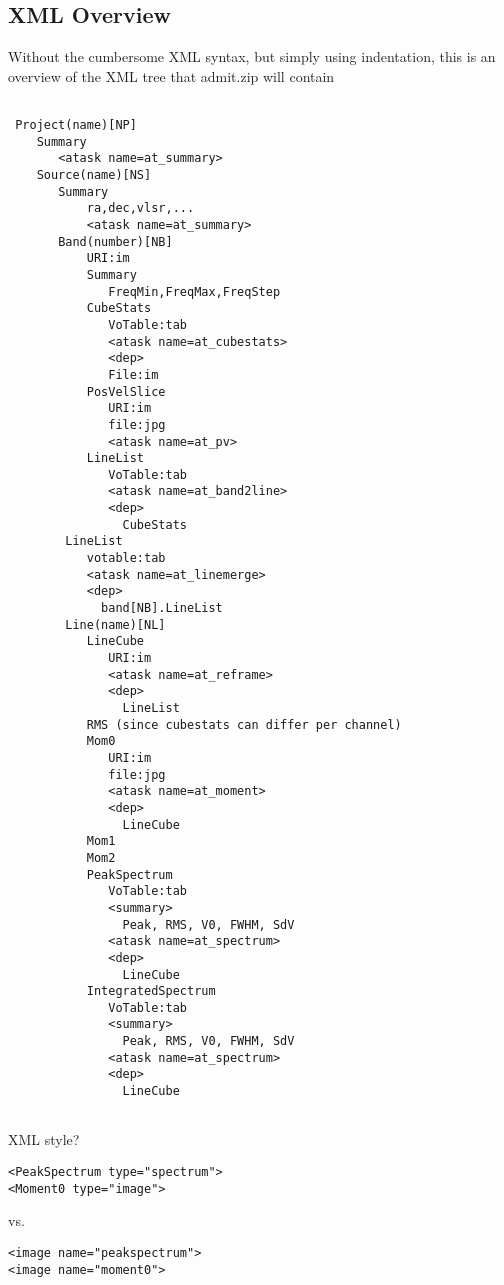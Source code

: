 \documentclass{report}
\begin{document}
\subsection{XML Overview}
Without the cumbersome XML syntax, but simply using indentation, this is an overview
of the XML tree that admit.zip will contain

\newpage

\footnotesize
\begin{verbatim}

 Project(name)[NP]
    Summary
       <atask name=at_summary>
    Source(name)[NS]
       Summary
           ra,dec,vlsr,...
           <atask name=at_summary>
       Band(number)[NB]
           URI:im
           Summary
              FreqMin,FreqMax,FreqStep
           CubeStats
              VoTable:tab
              <atask name=at_cubestats>
              <dep>
              File:im
           PosVelSlice
              URI:im
              file:jpg
              <atask name=at_pv>
           LineList
              VoTable:tab
              <atask name=at_band2line>
              <dep>
                CubeStats
        LineList
           votable:tab
           <atask name=at_linemerge>
           <dep>
             band[NB].LineList
        Line(name)[NL]
           LineCube
              URI:im
              <atask name=at_reframe>
              <dep>
                LineList
           RMS (since cubestats can differ per channel)
           Mom0
              URI:im
              file:jpg
              <atask name=at_moment>
              <dep>
                LineCube
           Mom1
           Mom2
           PeakSpectrum
              VoTable:tab
              <summary>
                Peak, RMS, V0, FWHM, SdV
              <atask name=at_spectrum>
              <dep>
                LineCube
           IntegratedSpectrum
              VoTable:tab
              <summary>
                Peak, RMS, V0, FWHM, SdV
              <atask name=at_spectrum>
              <dep>
                LineCube


\end{verbatim}
\normalsize

\newpage



XML style?

\footnotesize
\begin{verbatim}
<PeakSpectrum type="spectrum">
<Moment0 type="image">
\end{verbatim}
\normalsize
vs.

\footnotesize
\begin{verbatim}
<image name="peakspectrum">
<image name="moment0">
\end{verbatim}
\normalsize
\end{document}
